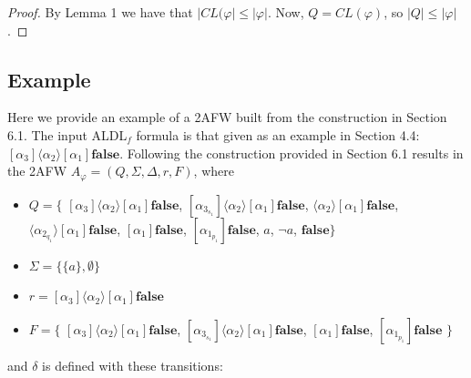 \documentclass[10pt,a4paper]{amsart}
\theoremstyle{plain}
\theoremstyle{definition}
\theoremstyle{definition}
\newcommand{\dbox}[1]{\langle #1 \rangle}
\newcommand{\bbox}[1]{[ #1 ]}
\DeclareMathOperator{\?}{?}
\begin{document}
\begin{proof}
  By Lemma 1 we have that $|CL(\varphi| \leq |\varphi|$. Now, $Q = CL(\varphi)$, so $|Q| \leq |\varphi|$.
\end{proof}

\subsection{Example}

Here we provide an example of a 2AFW built from the construction in Section 6.1. The input ALDL$_f$ formula is that given as an example in Section 4.4: $\bbox{\alpha_3}\dbox{\alpha_2}\bbox{\alpha_1}\textbf{false}$. Following the construction provided in Section 6.1 results in the 2AFW $A_\varphi = (Q, \Sigma, \Delta, r, F)$, where

\begin{itemize}
\item $Q = \{$
    $\bbox{\alpha_3}\dbox{\alpha_2}\bbox{\alpha_1}\textbf{false}$,
    $\bbox{\alpha_{3_{s_1}}}\dbox{\alpha_2}\bbox{\alpha_1}\textbf{false}$,
    $\dbox{\alpha_2}\bbox{\alpha_1}\textbf{false}$,
    $\dbox{\alpha_{2_{q_1}}}\bbox{\alpha_1}\textbf{false}$,
    $\bbox{\alpha_1}\textbf{false}$,
    $\bbox{\alpha_{1_{p_1}}}\textbf{false}$,
    $a$,
    $\neg a$,
    $\textbf{false}\}$

    \item $\Sigma = \{ \{a\}, \emptyset\}$

    \item $r = \bbox{\alpha_3}\dbox{\alpha_2}\bbox{\alpha_1}\textbf{false}$

    \item $F = \{$
      $\bbox{\alpha_3}\dbox{\alpha_2}\bbox{\alpha_1}\textbf{false}$,
      $\bbox{\alpha_{3_{s_1}}}\dbox{\alpha_2}\bbox{\alpha_1}\textbf{false}$,
      $\bbox{\alpha_1}\textbf{false}$,
      $\bbox{\alpha_{1_{p_1}}}\textbf{false}$
      $\}$
\end{itemize}

and $\delta$ is defined with these transitions:
\end{document}
